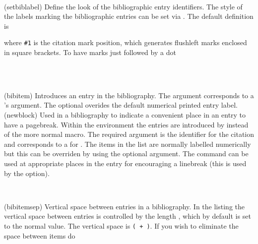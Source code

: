 \begin{syntax}
\cmd{\setbiblabel} \\
\end{syntax}
\glossary(setbiblabel)%
  {}%
  {Define the look of the bibliographic entry identifiers.}
The style of the labels marking the 
bibliographic entries can be set
via \cmd{\setbiblabel}. The default definition is
\begin{lcode}
\setbiblabel{[#1]\hfill}
\end{lcode}
where \verb?#1? is the citation mark position, which generates flushleft 
marks enclosed in square brackets. To have marks just
followed by a dot
\begin{lcode}
\end{lcode}

\begin{syntax}
\cmd{\bibitem} \\
\cmd{\newblock} \\
\end{syntax}
\glossary(bibitem)%
  {}%
  {Introduces an entry in the bibliography. The  argument
   corresponds to a 's  argument. The optional
    overides the default numerical printed entry label.}
\glossary(newblock)%
  {}%
  {Used in a bibliography to indicate a convenient place in an entry to
   have a pagebreak.}
Within the  environment the entries are introduced
by \cmd{\bibitem} instead of the more normal \cmd{\item} macro.
The required  argument is the identifier for the citation and
corresponds to a  for \cmd{\cite}. The items in the list
are normally labelled numerically but this can be overriden by using
the optional  argument. The \cmd{\newblock} command can be used
at appropriate places in the entry for encouraging a linebreak (this is
used by the  option).

\begin{syntax}
\lnc{\bibitemsep} \\
\end{syntax}
\glossary(bibitemsep)%
  {}%
  {Vertical space between entries in a bibliography.}
In the listing the vertical space between entries is controlled by the
length \lnc{\bibitemsep}, which by default is set to the normal 
\lnc{\itemsep} value. The vertical space is 
\texttt{(\lnc{\bibitemsep} + \lnc{\parsep})}. If you wish to eliminate
the space between items do
\begin{lcode}
\setlength{\bibitemsep}{-\parsep}
\end{lcode}

